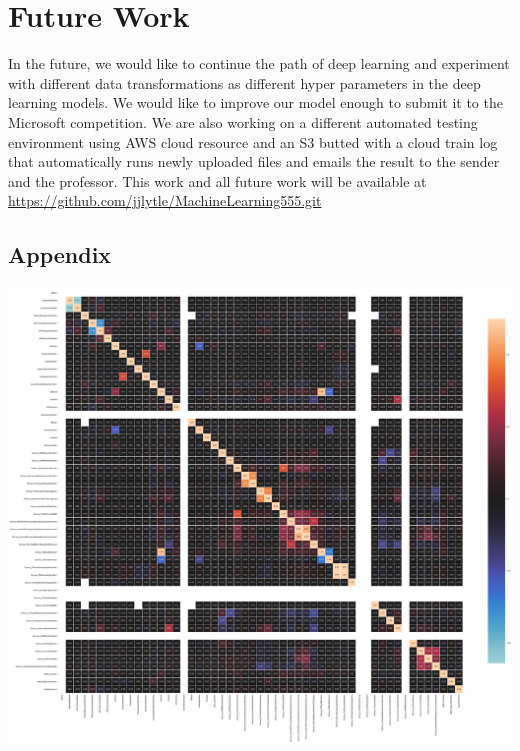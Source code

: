 \documentclass[sigconf]{acmart}
\begin{document}
\section{Future Work}
In the future, we would like to continue the path of deep learning and experiment with different data transformations as different hyper parameters in the deep learning models. We would like to improve our model enough to submit it to the Microsoft competition. We are also working on a different automated testing environment using AWS cloud resource and an S3 butted with a cloud train log that automatically runs newly uploaded files and emails the result to the sender and the professor.  This work and all future work will be available at \url{https://github.com/jjlytle/MachineLearning555.git}


\subsection{Appendix}

\label{lytle:correlation}
\includegraphics[scale=0.2]{correlation.PNG}

\end{document}
